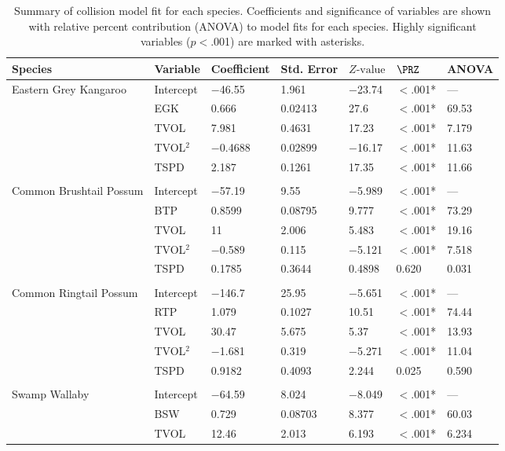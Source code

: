 \begin{table}[!t]
\caption[Summary of collision models for six mammal species]{Summary of collision model fit for each species. Coefficients and significance of variables are shown with relative percent contribution (ANOVA) to model fits for each species. Highly significant variables ($p<$.001) are marked with asterisks.}
\centering
\begin{tabularx}{0.9\textwidth}{lllllll} \toprule
Species & Variable & Coefficient & Std. Error & $Z\text{-value}$ & $\PRZ$ & ANOVA \\ 
\midrule
Eastern Grey Kangaroo & Intercept & $-$46.55 & 1.961 & $-$23.74 & $<$.001* & --- \\ 
   & EGK & 0.666 & 0.02413 & 27.6 & $<$.001* & 69.53 \\ 
   & TVOL & 7.981 & 0.4631 & 17.23 & $<$.001* & 7.179 \\ 
   & TVOL$^2$ & $-$0.4688 & 0.02899 & $-$16.17 & $<$.001* & 11.63 \\ 
   & TSPD & 2.187 & 0.1261 & 17.35 & $<$.001* & 11.66 \\ 
   &  &  &  &  &  &  \\ 
Common Brushtail Possum & Intercept & $-$57.19 & 9.55 & $-$5.989 & $<$.001* & --- \\ 
   & BTP & 0.8599 & 0.08795 & 9.777 & $<$.001* & 73.29 \\ 
   & TVOL & 11 & 2.006 & 5.483 & $<$.001* & 19.16 \\ 
   & TVOL$^2$ & $-$0.589 & 0.115 & $-$5.121 & $<$.001* & 7.518 \\ 
   & TSPD & 0.1785 & 0.3644 & 0.4898 & 0.620 & 0.031 \\ 
   &  &  &  &  &  &  \\ 
Common Ringtail Possum & Intercept & $-$146.7 & 25.95 & $-$5.651 & $<$.001* & --- \\ 
   & RTP & 1.079 & 0.1027 & 10.51 & $<$.001* & 74.44 \\ 
   & TVOL & 30.47 & 5.675 & 5.37 & $<$.001* & 13.93 \\ 
   & TVOL$^2$ & $-$1.681 & 0.319 & $-$5.271 & $<$.001* & 11.04 \\ 
   & TSPD & 0.9182 & 0.4093 & 2.244 & 0.025 & 0.590 \\ 
   &  &  &  &  &  &  \\ 
Swamp Wallaby & Intercept & $-$64.59 & 8.024 & $-$8.049 & $<$.001* & --- \\ 
   & BSW & 0.729 & 0.08703 & 8.377 & $<$.001* & 60.03 \\ 
   & TVOL & 12.46 & 2.013 & 6.193 & $<$.001* & 6.234 \\ 

\end{tabularx}
\end{table}
